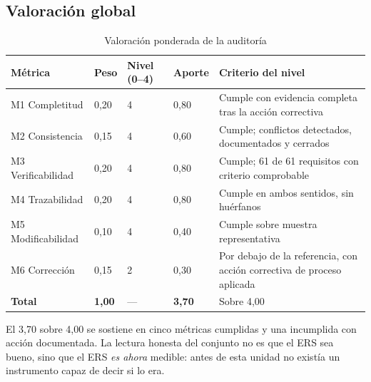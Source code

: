 \subsection{Valoración global}

\begin{table}[H]
\centering\footnotesize
\caption{Valoración ponderada de la auditoría}
\label{tab:valoracion}
\begin{tabular}{|L{4.6cm}|C{1.6cm}|C{1.8cm}|C{1.6cm}|L{4.6cm}|}
\hline
{}\textbf{Métrica} & \textbf{Peso} & \textbf{Nivel (0--4)} & \textbf{Aporte} & \textbf{Criterio del nivel}\\ \hline
M1 Completitud & 0,20 & 4 & 0,80 & Cumple con evidencia completa tras la acción correctiva\\ \hline
M2 Consistencia & 0,15 & 4 & 0,60 & Cumple; conflictos detectados, documentados y cerrados\\ \hline
M3 Verificabilidad & 0,20 & 4 & 0,80 & Cumple; 61 de 61 requisitos con criterio comprobable\\ \hline
M4 Trazabilidad & 0,20 & 4 & 0,80 & Cumple en ambos sentidos, sin huérfanos\\ \hline
M5 Modificabilidad & 0,10 & 4 & 0,40 & Cumple sobre muestra representativa\\ \hline
M6 Corrección & 0,15 & 2 & 0,30 & Por debajo de la referencia, con acción correctiva de proceso aplicada\\ \hline
\textbf{Total} & \textbf{1,00} & --- & \textbf{3,70} & Sobre 4,00\\ \hline
\end{tabular}
\end{table}

\noindent
El 3,70 sobre 4,00 se sostiene en cinco métricas cumplidas y una incumplida con acción documentada.
La lectura honesta del conjunto no es que el ERS sea bueno, sino que el ERS \emph{es ahora} medible:
antes de esta unidad no existía un instrumento capaz de decir si lo era.
